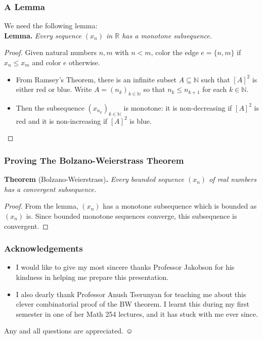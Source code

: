 \documentclass{beamer}
\begin{document}
\begin{frame}
\frametitle{A Lemma} We need the following lemma: \\

\textbf{Lemma.} \emph{Every sequence \( (x_{n}) \) in \( \mathbb{R} \) has a monotone subsequence.}
\begin{proof}
	Given natural numbers \( n , m  \) with \( n < m \), color the edge \( e = \{n , m \}  \) {\color{red}{red}} if \( x_{n} \leq x_{m}  \) and color \( e \) {\color{blue}{blue}} otherwise.
	\begin{itemize}
		\item From Ramsey's Theorem, there is an infinite subset \( A \subseteq \mathbb{N}  \) such that \( [A]^{2}  \) is either red or blue. Write \( A = (n_{k} )_{k \in \mathbb{N} }  \) so that \( n_k \leq n_{k+1} \) for each \( k \in \mathbb{N}  \).
		\item Then the subsequence \( (x_{n_{k} })_{k \in \mathbb{N}}  \) is monotone: it is non-decreasing if \( [A]^{2}  \) is red and it is non-increasing if \( [A]^{2}  \) is blue.

		
	\end{itemize}
\end{proof}
\end{frame}

\begin{frame}
	\frametitle{Proving The Bolzano-Weierstrass Theorem} \textbf{Theorem} (Bolzano-Weierstrass)\textbf{.} \emph{Every bounded sequence \( (x_{n}) \) of real numbers has a convergent subsequence.}
\begin{proof}
From the lemma, \( (x_{n}) \) has a monotone subsequence which is bounded as \( (x_{n}) \) is. Since bounded monotone sequences converge, this subsequence is convergent.
\end{proof}
\end{frame}

\begin{frame}
	\frametitle{Acknowledgements}

\begin{itemize}
	\item I would like to give my most sincere thanks Professor Jakobson for his kindness in helping me prepare this presentation. 
	\item I also dearly thank Professor Anush Tserunyan for teaching me about this clever combinatorial proof of the BW theorem. I learnt this during my first semester in one of her Math 254 lectures, and it has stuck with me ever since.
\end{itemize}

\end{frame}

\begin{frame}
	\begin{center}
		{\Large {}} \newline \newline
		\large Any and all questions are appreciated. $\smiley$
	\end{center}
\end{frame}
\end{document}

